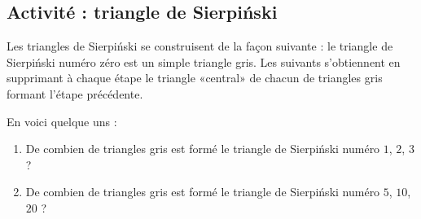
\subsection*{Activité : triangle de Sierpiński}

Les triangles de Sierpiński se construisent de la façon suivante : le triangle de Sierpiński numéro zéro est un simple triangle gris. Les suivants s'obtiennent en supprimant à chaque étape le triangle «central» de chacun de triangles gris formant l'étape précédente.

En voici quelque uns :

\newcommand{\CaptionFigMOCGooKjSrVV}{Quelque triangles de Sierpiński}


\begin{enumerate}
    \item
        De combien de triangles gris est formé le triangle de Sierpiński numéro \( 1\), \( 2\), \( 3\) ?
    \item
        De combien de triangles gris est formé le triangle de Sierpiński numéro \( 5\), \( 10\), \( 20\) ?
\end{enumerate}
